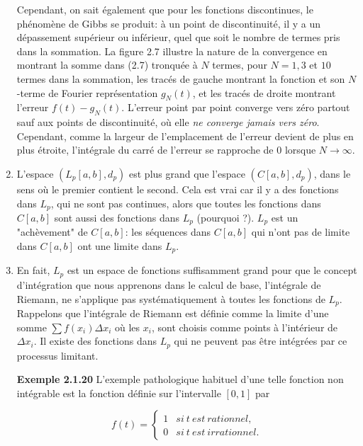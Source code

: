 \documentclass[10pt,twoside,a4paper]{book}
\begin{document}
\begin{enumerate}
  \noindent
  Cependant, on sait également que pour les fonctions discontinues, le phénomène de Gibbs se produit: à un point de discontinuité, il y a un dépassement supérieur ou inférieur, quel que soit le nombre de termes pris dans la sommation. 
  La figure 2.7 illustre la nature de la convergence en montrant la somme dans (2.7) tronquée à $N$ termes, pour $N = 1, 3$ et $10$ termes dans la sommation, les tracés de gauche montrant la fonction et son $N$-terme de Fourier représentation $g_N(t)$, 
  et les tracés de droite montrant l'erreur $f(t) - g_N(t)$. L'erreur point par point converge vers zéro partout sauf aux points de discontinuité, où elle \textit{ne converge jamais vers zéro}. 
  Cependant, comme la largeur de l'emplacement de l'erreur devient de plus en plus étroite, l'intégrale du carré de l'erreur se rapproche de 0 lorsque $N \longrightarrow \infty$.

  \item L'espace $(L_p[a, b], d_p)$ est plus grand que l'espace $(C[a, b], d_p)$, dans le sens où le premier contient le second. Cela est vrai car il y a des fonctions dans $L_p$, qui ne sont pas continues, alors que toutes les fonctions dans $C[a, b]$ sont aussi des fonctions dans $L_p$ (pourquoi ?). 
  $L_p$ est un "achèvement" de $C[a, b]$: les séquences dans $C[a, b]$ qui n'ont pas de limite dans $C[a, b]$ ont une limite dans $L_p$.

  \item En fait, $L_p$ est un espace de fonctions suffisamment grand pour que le concept d'intégration que nous apprenons dans le calcul de base, l'intégrale de Riemann, ne s'applique pas systématiquement à toutes les fonctions de $L_p$. Rappelons que l'intégrale de Riemann est définie comme la limite d'une somme 
  $\sum f(x_i) \Delta x_i$ où les $x_i$, sont choisis comme points à l'intérieur de $\Delta x_i$. Il existe des fonctions dans $L_p$ qui ne peuvent pas être intégrées par ce processus limitant.

  \vspace{4mm}
  \noindent
  \textbf{Exemple 2.1.20} L'exemple pathologique habituel d'une telle fonction non intégrable est la fonction définie sur l'intervalle $[0, 1]$ par

  \begin{equation}
    f(t) = \begin{cases} 1 & si \ t \ est \ rationnel, \\
      0 &  si \ t \ est \ irrationnel.
          \end{cases}
  \end{equation}


\end{enumerate}
\end{document}

